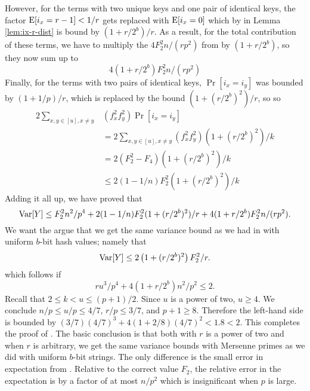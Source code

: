 However, for the terms with two unique keys and one pair of identical
keys, the factor $\operatorname*{E}[i_x=r-1]<1/r$ gets replaced with $\operatorname*{E}[i_x=0]$
which by  in Lemma \ref{lem:ix-r-dist} is bound by
$(1+r/2^b)/r$. As a result, for the total contribution of these terms,
we have to multiply the $4 F_2^2 n/(rp^2)$ from  by
$(1+r/2^b)$, so they now sum up to
\begin{equation}\label{eq:one-pair'}
   4 (1+r/2^b) F_2^2 n/(rp^2)
\end{equation}
Finally, for the terms with two pairs of identical keys, $\Pr[i_x=i_y]$ was bounded
by $(1+1/p)/r$, which is replaced by the bound $\left(1+(r/2^b)^2\right)/r$, so
so 
\begin{align}
   2\sum_{x,y\in[u],x\neq y}&(f_x^2f_y^2)\Pr[i_x=i_y]\nonumber\\
                            &=2\sum_{x,y\in[u],x\neq y}(f_x^2f_y^2)(1+(r/2^b)^2)/k\nonumber\\
                            &=2(F_2^2-F_4)(1+(r/2^b)^2)/k\nonumber\\
                            &\leq 2(1-1/n)F_2^2(1+(r/2^b)^2)/k\label{eq:two-pairs'}
\end{align}
Adding it all up, we have proved that 
\[\operatorname*{Var}[Y]\leq F_2^2 n^2/p^4+2(1-1/n)F_2^2(1+(r/2^b)^2)/r+4(1+r/2^b)F_2^2 n/(rp^2).\]
We want the argue that we get the same variance bound as we had in 
 with uniform $b$-bit hash values; namely that
\begin{equation}\label{eq:Var-Mersenne-arb-r}
   \operatorname*{Var}[Y]\leq 2\left(1+(r/2^b)^2\right)F_2^2/r.
\end{equation}
which follows if 
\[ru^3/p^4+4(1+r/2^b)n^2/p^2\leq 2.\]
Recall that $2\leq k<u\leq (p+1)/2$. Since $u$ is a power of two,
$u\geq 4$. We conclude $n/p\leq u/p\leq 4/7$, $r/p\leq 3/7$, and
$p+1\geq 8$. Therefore the left-hand side is bounded by
$(3/7)(4/7)^3+4(1+2/8)(4/7)^2<1.8<2$.  This completes the proof of
. The basic conclusion is that both with
$r$ is a power of two and when $r$ is arbitrary, we get the same
variance bounds with Mersenne primes as we did with uniform $b$-bit
strings. The only difference is the small error in expectation from
. Relative to the correct value $F_2$, the
relative error in the expectation is by a factor of at most
$n/p^2$ which is insignificant when $p$ is large.


